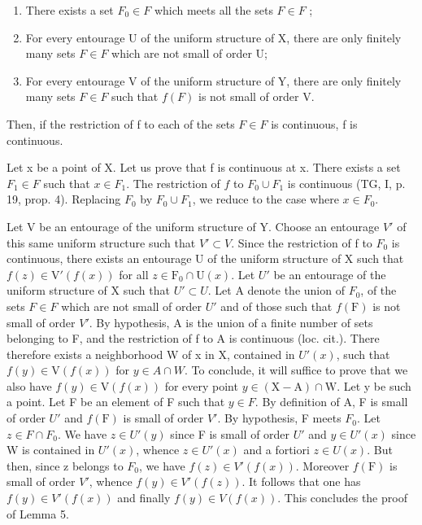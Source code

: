 \begin{enumerate}
\def\labelenumi{(\roman{enumi})}
\item
  There exists a set \(F_{0} \in F\) which meets all the sets \(F \in F\) ;
\item
  For every entourage U of the uniform structure of X, there are only finitely many sets \(F \in F\) which are not small of order U;
\item
  For every entourage V of the uniform structure of Y, there are only finitely many sets \(F \in F\) such that \(f(F)\) is not small of order V.
\end{enumerate}

Then, if the restriction of f to each of the sets \(F \in F\) is continuous, f is continuous.

Let x be a point of X. Let us prove that f is continuous at x. There exists a set \(F_{1} \in F\) such that \(x \in F_{1}\). The restriction of \(f\) to \(F_{0} \cup F_{1}\) is continuous (TG, I, p. 19, prop. 4). Replacing \(F_{0}\) by \(F_{0} \cup F_{1}\), we reduce to the case where \(x \in F_{0}\).

Let V be an entourage of the uniform structure of Y. Choose an entourage \(V'\) of this same uniform structure such that \(V' \subset V\). Since the restriction of f to \(F_0\) is continuous, there exists an entourage U of the uniform structure of X such that \(f(z) \in \mathrm{V}'(f(x))\) for all \(z \in \mathrm{F}_0 \cap \mathrm{U}(x)\). Let \(U'\) be an entourage of the uniform structure of X such that \(U' \subset U\). Let A denote the union of \(F_0\), of the sets \(F \in F\) which are not small of order \(U'\) and of those such that \(f(\mathrm{F})\) is not small of order \(V'\). By hypothesis, A is the union of a finite number of sets belonging to F, and the restriction of f to A is continuous (loc. cit.). There therefore exists a neighborhood W of x in X, contained in \(U'(x)\), such that \(f(y) \in \mathrm{V}(f(x))\) for \(y \in A \cap W\). To conclude, it will suffice to prove that we also have \(f(y) \in \mathrm{V}(f(x))\) for every point \(y \in (\mathrm{X} - \mathrm{A}) \cap \mathrm{W}\). Let y be such a point. Let F be an element of F such that \(y \in F\). By definition of A, F is small of order \(U'\) and \(f(\mathrm{F})\) is small of order \(V'\). By hypothesis, F meets \(F_0\). Let \(z \in F \cap F_0\). We have \(z \in U'(y)\) since F is small of order \(U'\) and \(y \in U'(x)\) since W is contained in \(U'(x)\), whence \(z \in U'(x)\) and a fortiori \(z \in U(x)\). But then, since z belongs to \(F_0\), we have \(f(z) \in V'(f(x))\). Moreover \(f(\mathrm{F})\) is small of order \(V'\), whence \(f(y) \in V'(f(z))\). It follows that one has \(f(y) \in V'(f(x))\) and finally \(f(y) \in V(f(x))\). This concludes the proof of Lemma 5.

